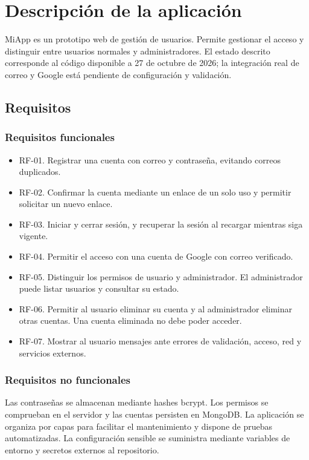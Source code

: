 \chapter{Descripción de la aplicación}
MiApp es un prototipo web de gestión de usuarios. Permite gestionar el acceso y distinguir entre usuarios normales y administradores. El estado descrito corresponde al código disponible a 27 de octubre de 2026; la integración real de correo y Google está pendiente de configuración y validación.

\section{Requisitos}
\subsection{Requisitos funcionales}
\begin{itemize}
\item RF-01. Registrar una cuenta con correo y contraseña, evitando correos duplicados.
\item RF-02. Confirmar la cuenta mediante un enlace de un solo uso y permitir solicitar un nuevo enlace.
\item RF-03. Iniciar y cerrar sesión, y recuperar la sesión al recargar mientras siga vigente.
\item RF-04. Permitir el acceso con una cuenta de Google con correo verificado.
\item RF-05. Distinguir los permisos de usuario y administrador. El administrador puede listar usuarios y consultar su estado.
\item RF-06. Permitir al usuario eliminar su cuenta y al administrador eliminar otras cuentas. Una cuenta eliminada no debe poder acceder.
\item RF-07. Mostrar al usuario mensajes ante errores de validación, acceso, red y servicios externos.
\end{itemize}
\subsection{Requisitos no funcionales}
Las contraseñas se almacenan mediante hashes bcrypt. Los permisos se comprueban en el servidor y las cuentas persisten en MongoDB. La aplicación se organiza por capas para facilitar el mantenimiento y dispone de pruebas automatizadas. La configuración sensible se suministra mediante variables de entorno y secretos externos al repositorio.

